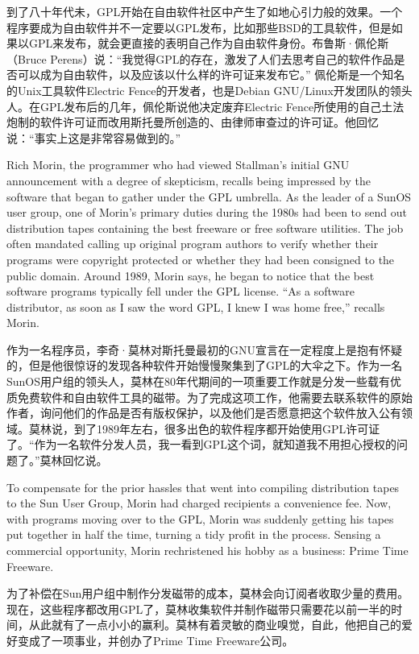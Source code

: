 \ifdefined\chs
到了八十年代未，GPL开始在自由软件社区中产生了如地心引力般的效果。一个程序要成为自由软件并不一定要以GPL发布，比如那些BSD的工具软件，但是如果以GPL来发布，就会更直接的表明自己作为自由软件身份。布鲁斯·佩伦斯（Bruce Perens）说：``我觉得GPL的存在，激发了人们去思考自己的软件作品是否可以成为自由软件，以及应该以什么样的许可证来发布它。'' 佩伦斯是一个知名的Unix工具软件Electric Fence的开发者，也是Debian GNU/Linux开发团队的领头人。在GPL发布后的几年，佩伦斯说他决定废弃Electric Fence所使用的自己土法炮制的软件许可证而改用斯托曼所创造的、由律师审查过的许可证。他回忆说：``事实上这是非常容易做到的。''
\fi

\ifdefined\eng
Rich Morin, the programmer who had viewed Stallman's initial GNU announcement with a degree of skepticism, recalls being impressed by the software that began to gather under the GPL umbrella. As the leader of a SunOS user group, one of Morin's primary duties during the 1980s had been to send out distribution tapes containing the best freeware or free software utilities. The job often mandated calling up original program authors to verify whether their programs were copyright protected or whether they had been consigned to the public domain. Around 1989, Morin says, he began to notice that the best software programs typically fell under the GPL license. ``As a software distributor, as soon as I saw the word GPL, I knew I was home free,'' recalls Morin.
\fi

\ifdefined\chs
作为一名程序员，李奇·莫林对斯托曼最初的GNU宣言在一定程度上是抱有怀疑的，但是他很惊讶的发现各种软件开始慢慢聚集到了GPL的大伞之下。作为一名SunOS用户组的领头人，莫林在80年代期间的一项重要工作就是分发一些载有优质免费软件和自由软件工具的磁带。为了完成这项工作，他需要去联系软件的原始作者，询问他们的作品是否有版权保护，以及他们是否愿意把这个软件放入公有领域。莫林说，到了1989年左右，很多出色的软件程序都开始使用GPL许可证了。``作为一名软件分发人员，我一看到GPL这个词，就知道我不用担心授权的问题了。''莫林回忆说。
\fi

\ifdefined\eng
To compensate for the prior hassles that went into compiling distribution tapes to the Sun User Group, Morin had charged recipients a convenience fee. Now, with programs moving over to the GPL, Morin was suddenly getting his tapes put together in half the time, turning a tidy profit in the process. Sensing a commercial opportunity, Morin rechristened his hobby as a business: Prime Time Freeware.
\fi

\ifdefined\chs
为了补偿在Sun用户组中制作分发磁带的成本，莫林会向订阅者收取少量的费用。现在，这些程序都改用GPL了，莫林收集软件并制作磁带只需要花以前一半的时间，从此就有了一点小小的赢利。莫林有着灵敏的商业嗅觉，自此，他把自己的爱好变成了一项事业，并创办了Prime Time Freeware公司。
\fi

